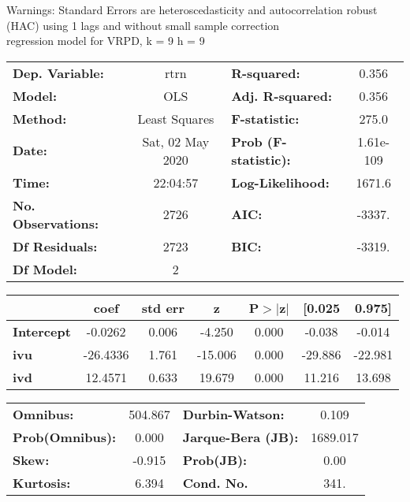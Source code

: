 Warnings: \newline
 [1] Standard Errors are heteroscedasticity and autocorrelation robust (HAC) using 1 lags and without small sample correction\\ 

regression model for VRPD, k = 9 h = 9\begin{center}
\begin{tabular}{lclc}
\toprule
\textbf{Dep. Variable:}    &       rtrn       & \textbf{  R-squared:         } &     0.356   \\
\textbf{Model:}            &       OLS        & \textbf{  Adj. R-squared:    } &     0.356   \\
\textbf{Method:}           &  Least Squares   & \textbf{  F-statistic:       } &     275.0   \\
\textbf{Date:}             & Sat, 02 May 2020 & \textbf{  Prob (F-statistic):} & 1.61e-109   \\
\textbf{Time:}             &     22:04:57     & \textbf{  Log-Likelihood:    } &    1671.6   \\
\textbf{No. Observations:} &        2726      & \textbf{  AIC:               } &    -3337.   \\
\textbf{Df Residuals:}     &        2723      & \textbf{  BIC:               } &    -3319.   \\
\textbf{Df Model:}         &           2      & \textbf{                     } &             \\
\bottomrule
\end{tabular}
\begin{tabular}{lcccccc}
                   & \textbf{coef} & \textbf{std err} & \textbf{z} & \textbf{P$> |$z$|$} & \textbf{[0.025} & \textbf{0.975]}  \\
\midrule
\textbf{Intercept} &      -0.0262  &        0.006     &    -4.250  &         0.000        &       -0.038    &       -0.014     \\
\textbf{ivu}       &     -26.4336  &        1.761     &   -15.006  &         0.000        &      -29.886    &      -22.981     \\
\textbf{ivd}       &      12.4571  &        0.633     &    19.679  &         0.000        &       11.216    &       13.698     \\
\bottomrule
\end{tabular}
\begin{tabular}{lclc}
\textbf{Omnibus:}       & 504.867 & \textbf{  Durbin-Watson:     } &    0.109  \\
\textbf{Prob(Omnibus):} &   0.000 & \textbf{  Jarque-Bera (JB):  } & 1689.017  \\
\textbf{Skew:}          &  -0.915 & \textbf{  Prob(JB):          } &     0.00  \\
\textbf{Kurtosis:}      &   6.394 & \textbf{  Cond. No.          } &     341.  \\
\bottomrule
\end{tabular}
\end{center}

